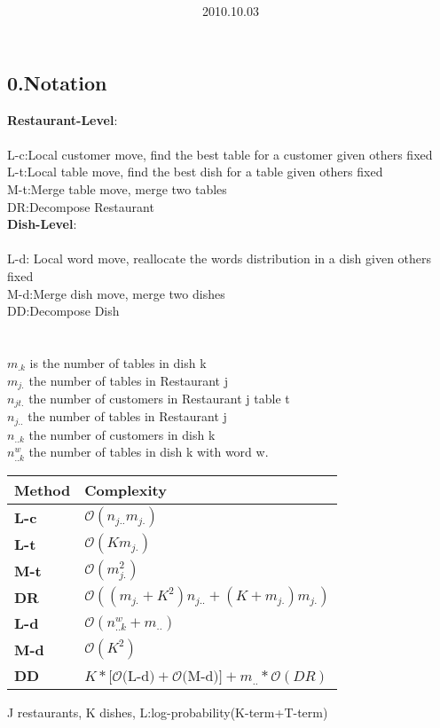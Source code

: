 \documentclass{article}
\title{\vspace{0.3in}\textmd{\textbf{\hmwkTitle}}}
\date{2010.10.03}
\author{\textbf{\hmwkAuthorName}}
\begin{document}
\begin{spacing}{1.1}
\maketitle
\section{0.Notation}
{\bf Restaurant-Level}:\\\\
L-c:Local customer move, find the best table for a customer given others fixed\\
L-t:Local table move, find the best dish for a table given others fixed\\
M-t:Merge table move, merge two tables\\
DR:Decompose Restaurant\\
{\bf Dish-Level}:\\\\
L-d: Local word move, reallocate the words distribution in a dish given others fixed\\
M-d:Merge dish move, merge two dishes\\
DD:Decompose Dish\\ \\ \\
$m_{.k}$ is the number of tables in dish k\\
$m_{j.}$ the number of tables in Restaurant j\\
$n_{jt.}$ the number of customers in Restaurant j table t\\
$n_{j..}$ the number of tables in Restaurant j\\
$n_{..k}$ the number of customers in dish k\\
$n_{..k}^{w}$ the number of tables in dish k with word w.\\
\begin{table}[t]
\begin{center}
\begin{tabular}{|l|l|}
\hline
{\bf Method} &{\bf Complexity} \\ 
\hline
\bf{L-c} & $\mathcal{O}(n_{j..}m_{j.})$\\
\hline
\bf{L-t} & $\mathcal{O}(Km_{j.})$\\
\hline
\bf{M-t} & $\mathcal{O}(m_{j.}^{2})$\\
\hline
\bf{DR}&$\mathcal{O}((m_{j.}+K^{2})n_{j..}+(K+m_{j.})m_{j.})$\\
\hline
\bf{L-d} & $\mathcal{O}(n_{..k}^{w}+m_{..})$\\
\hline
\bf{M-d} & $\mathcal{O}(K^{2})$\\
\hline
\bf{DD}&   $K*[\mathcal{O}($L-d$)+\mathcal{O}($M-d$)] +m_{..}*\mathcal{O}(DR)$\\
\hline
\end{tabular}
\end{center}
\end{table}
\newpage
J restaurants, K dishes, L:log-probability(K-term+T-term)

\end{spacing}
\end{document}
